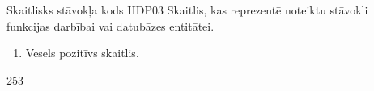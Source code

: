 \parameterTable
{Skaitlisks stāvokļa kods}
{IIDP03}
{
	Skaitlis, kas reprezentē noteiktu stāvokli funkcijas darbībai vai datubāzes entitātei.
}
{
	\begin{enumerate}
		\item Vesels pozitīvs skaitlis.
	\end{enumerate}
}
{
	253
}
